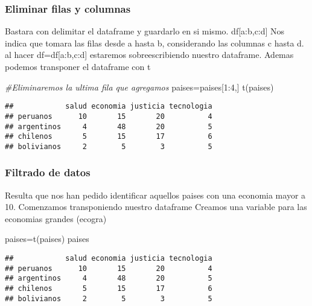 \documentclass[
]{article}
\newenvironment{Shaded}{\begin{snugshade}}{\end{snugshade}}
\newcommand{\CommentTok}[1]{\textcolor[rgb]{0.56,0.35,0.01}{\textit{#1}}}
\newcommand{\DecValTok}[1]{\textcolor[rgb]{0.00,0.00,0.81}{#1}}
\newcommand{\FunctionTok}[1]{\textcolor[rgb]{0.00,0.00,0.00}{#1}}
\newcommand{\NormalTok}[1]{#1}
\newcommand{\OtherTok}[1]{\textcolor[rgb]{0.56,0.35,0.01}{#1}}
\newcommand{\SpecialCharTok}[1]{\textcolor[rgb]{0.00,0.00,0.00}{#1}}
\begin{document}
\hypertarget{eliminar-filas-y-columnas}{%
\subsubsection{Eliminar filas y
columnas}\label{eliminar-filas-y-columnas}}

Bastara con delimitar el dataframe y guardarlo en si mismo.
df{[}a:b,c:d{]} Nos indica que tomara las filas desde a hasta b,
considerando las columnas c hasta d. al hacer df=df{[}a:b,c:d{]}
estaremos sobreescribiendo nuestro dataframe. Ademas podemos transponer
el dataframe con t

\begin{Shaded}
\begin{Highlighting}[]
\CommentTok{\#Eliminaremos la ultima fila que agregamos}
\NormalTok{paises}\OtherTok{=}\NormalTok{paises[}\DecValTok{1}\SpecialCharTok{:}\DecValTok{4}\NormalTok{,]}
\FunctionTok{t}\NormalTok{(paises)}
\end{Highlighting}
\end{Shaded}

\begin{verbatim}
##            salud economia justicia tecnologia
## peruanos      10       15       20          4
## argentinos     4       48       20          5
## chilenos       5       15       17          6
## bolivianos     2        5        3          5
\end{verbatim}

\hypertarget{filtrado-de-datos}{%
\subsubsection{Filtrado de datos}\label{filtrado-de-datos}}

Resulta que nos han pedido identificar aquellos paises con una economia
mayor a 10. Comenzamos transponiendo nuestro dataframe Creamos una
variable para las economias grandes (ecogra)

\begin{Shaded}
\begin{Highlighting}[]
\NormalTok{paises}\OtherTok{=}\FunctionTok{t}\NormalTok{(paises)}
\NormalTok{paises}
\end{Highlighting}
\end{Shaded}

\begin{verbatim}
##            salud economia justicia tecnologia
## peruanos      10       15       20          4
## argentinos     4       48       20          5
## chilenos       5       15       17          6
## bolivianos     2        5        3          5
\end{verbatim}
\end{document}
